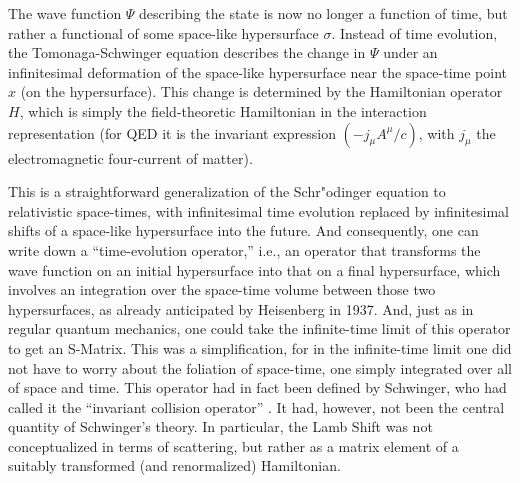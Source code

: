 \documentclass[12pt,a4paper]{article}
\begin{document}
The wave function $\Psi$ describing the state is now no longer a function of time, but rather a functional of some space-like hypersurface $\sigma$. Instead of time evolution, the Tomonaga-Schwinger equation describes the change in $\Psi$ under an infinitesimal deformation of the space-like hypersurface near the space-time point $x$ (on the hypersurface). This change is determined by the Hamiltonian operator $H$, which is simply the field-theoretic Hamiltonian in the interaction representation (for QED it is the invariant expression $\left( - j_{\mu} A^{\mu}/c \right)$, with $j_{\mu}$ the electromagnetic four-current of matter). 

This is a straightforward generalization of the Schr"odinger equation to relativistic space-times, with infinitesimal time evolution replaced by infinitesimal shifts of a space-like hypersurface into the future. And consequently, one can write down a ``time-evolution operator,'' i.e., an operator that transforms the wave function on an initial hypersurface into that on a final hypersurface, which involves an integration over the space-time volume between those two hypersurfaces, as already anticipated by Heisenberg in 1937. And, just as in regular quantum mechanics, one could take the infinite-time limit of this operator to get an S-Matrix. This was a simplification, for in the infinite-time limit one did not have to worry about the foliation of space-time, one simply integrated over all of space and time. This operator had in fact been defined by Schwinger, who had called it the ``invariant collision operator'' \citep[sec. 4]{schwinger_1948_quantum}. It had, however, not been the central quantity of Schwinger's theory. In particular, the Lamb Shift was not conceptualized in terms of scattering, but rather as a matrix element of a suitably transformed (and renormalized) Hamiltonian.
\end{document}
